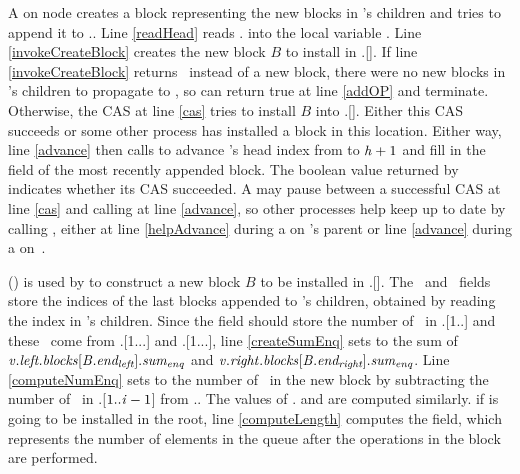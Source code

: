 A  on node  creates a block representing the new blocks
in 's
children and tries to append it to .. 
Line \ref{readHead} reads . into the local variable .
Line \ref{invokeCreateBlock} creates the new block $B$ to install in .[].
If line \ref{invokeCreateBlock} returns \nl\ instead of a new block, there were no new blocks in 's children to propagate to , so  can return true at line \ref{addOP} and terminate.
Otherwise, the CAS at line \ref{cas} tries to install $B$ into .[].
Either this CAS succeeds or some other process has installed a  block in this location.
Either way, line \ref{advance} then calls  to advance 's head index 
from  to $\mbox{\textnormal{\textit{h}}}+1$
and fill in the  field of the most recently appended block.
The boolean value returned by  indicates whether its CAS succeeded.
A  may pause between a successful CAS at line \ref{cas} and calling  at line \ref{advance},
so other processes help keep  up to date by  calling , 
either at line \ref{helpAdvance} during a  on 's parent or line \ref{advance} during a  on~.

() is used
by  to construct a new block $B$ to be installed in .[].
The \eleft\ and \eright\ fields store the indices of the last blocks appended to 's
children, obtained by reading the  index in 's children.
Since the  field should store the number of \enqueues\ in
.[1..] and these \enqueues\ come from .[1...\eleft] and .[1...\eright], line \ref{createSumEnq} sets
 to the sum of $\mbox{\textnormal{\textit{v}}}.\mbox{\textit{left.blocks}}[\mbox{\textnormal{\textit{B}}}.\mbox{\textit{end\textsubscript{left}}}].\mbox{\textit{sum\textsubscript{enq}}}$ and $\mbox{\textnormal{\textit{v}}}.\mbox{\textit{right}}.\mbox{\textit{blocks}}[\mbox{\textnormal{\textit{B}}}.\mbox{\textit{end\textsubscript{right}}}].\mbox{\textit{sum\textsubscript{enq}}}$.
Line \ref{computeNumEnq} sets  to the number of \enqueues\ in the new block by
subtracting  the number of \enqueues\ in .[$1..\mbox{\textnormal{\textit{i}}}-1$] from ..
The values of . and  are computed similarly.
 if 
is going to be installed in the root, line \ref{computeLength} computes the  field, which
represents the number of elements in the queue after the operations in the block are performed.


